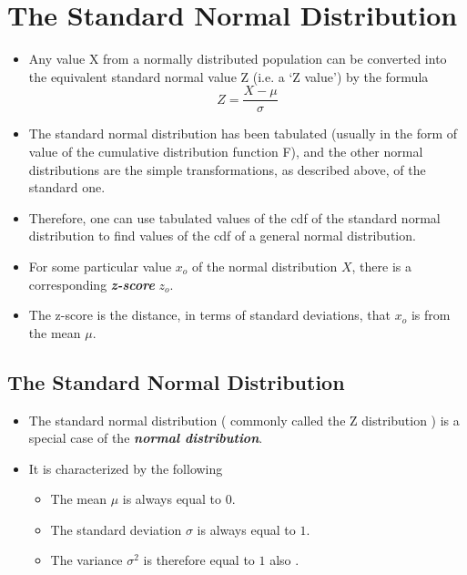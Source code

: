 \documentclass[]{report}
\begin{document}
\section{The Standard Normal Distribution}

\begin{itemize}

\item Any value X from a normally distributed population can be converted into the equivalent standard
normal value Z (i.e. a `Z value') by the formula
\[ Z = \frac{X - \mu}{\sigma}\]

\item The standard normal distribution has been tabulated (usually in the form of value of the cumulative distribution function F), and the other normal distributions are the simple transformations, as described above, of the standard one. \item Therefore, one can use tabulated values of the cdf of the standard normal distribution to 
find values of the cdf of a general normal distribution.


\item For some particular value $x_o$ of the normal distribution $X$, there is a corresponding \textbf{\textit{z-score}} $z_o$. 
\item The z-score is the distance, in terms of standard deviations, that $x_o$ is from the mean $\mu$.
\end{itemize}







\subsection{The Standard Normal Distribution}

\begin{itemize}
\item The standard normal distribution ( commonly called the Z distribution ) is a special case of the \textbf{\emph{normal distribution}}.
\item It is characterized by the following

\begin{itemize}

\item The mean $\mu$ is always equal to $0$.
\item The standard deviation $\sigma$ is always equal to $1$.
\item The variance $\sigma^2$ is therefore equal to $1$ also .
\end{itemize}
\end{itemize}
\end{document}
